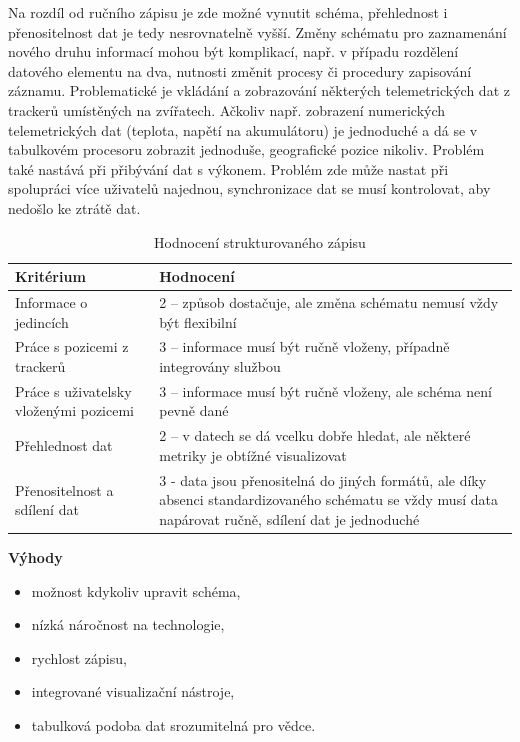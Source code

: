 Na rozdíl od ručního zápisu je zde možné vynutit schéma, přehlednost i přenositelnost dat je tedy nesrovnatelně vyšší. Změny schématu pro zaznamenání nového druhu informací mohou být komplikací, např. v případu rozdělení datového elementu na dva, nutnosti změnit procesy či procedury zapisování záznamu. Problematické je vkládání a zobrazování některých telemetrických dat z trackerů umístěných na zvířatech. Ačkoliv např. zobrazení numerických telemetrických dat (teplota, napětí na akumulátoru) je jednoduché a dá se v tabulkovém procesoru zobrazit jednoduše, geografické pozice nikoliv. Problém také nastává při přibývání dat s výkonem. Problém zde může nastat při spolupráci více uživatelů najednou, synchronizace dat se musí kontrolovat, aby nedošlo ke ztrátě dat.

\begin{table}[H]
	\begin{tabularx}{\textwidth}{ | X | X | }
		\hline
		Kritérium                              & Hodnocení \\
		\hline			
		Informace o jedincích                  & 2 -- způsob dostačuje, ale změna schématu nemusí vždy být flexibilní          \\
		\hline
		Práce s pozicemi z trackerů            & 3 -- informace musí být ručně vloženy, případně integrovány službou          \\
		\hline
		Práce s uživatelsky vloženými pozicemi & 3 -- informace musí být ručně vloženy, ale schéma není pevně dané          \\
		\hline
		Přehlednost dat                        & 2 -- v datech se dá vcelku dobře hledat, ale některé metriky je obtížné visualizovat          \\
		\hline
		Přenositelnost a sdílení dat           & 3 - data jsou přenositelná do jiných formátů, ale díky absenci standardizovaného schématu se vždy musí data napárovat ručně, sdílení dat je jednoduché          \\
		\hline	
	\end{tabularx}
	\caption{Hodnocení strukturovaného zápisu}
\end{table}

\textbf{Výhody}
\nolisttopbreak
\begin{itemize}
	\item možnost kdykoliv upravit schéma,
	\item nízká náročnost na technologie,
	\item rychlost zápisu,
	\item integrované visualizační nástroje,
	\item tabulková podoba dat srozumitelná pro vědce.
\end{itemize}

